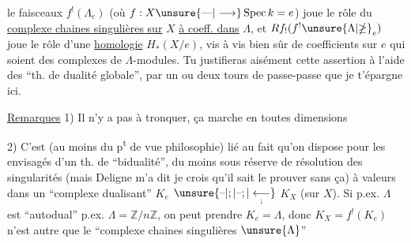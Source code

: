 %
le  faisceaux $f^!(\Lambda_e)$ (où $f:X\unsure{\text{---}|\longrightarrow}\operatorname{Spec} k=e$) joue le rôle du \uline{complexe  chaines singulières sur} $X$ \uline{à coeff. dans} $\Lambda$, et $Rf_!(f^!{\unsure{\Lambda|\mathbb{\Lambda}}}_e)$ joue le rôle d'une \uline{homologie} $H_*(X/e)$, vis à vis bien sûr de coefficients sur $e$ qui soient des complexes de $\Lambda$-modules. Tu justifieras aisément cette assertion à l'aide des ``th. de dualité globale'', par un ou deux tours de passe-passe que je t'épargne ici.

\uline{Remarques} 1) Il n'y a pas à tronquer, ça marche en toutes dimensions

2) C'est (au moins du p\textsuperscript{t} de vue philosophie) lié au fait qu'on dispose pour les  envisagés  d'un th. de ``bidualité''\unsure{\deleted{)}|\textsuperscript{(*)}}, du moins sous réserve de résolution des singularités (mais Deligne m'a dit je crois qu'il sait le prouver sans ça) à valeurs dans un ``complexe dualisant'' $K_e$  $\unsure{\text{--}|;|\text{--};|\underset{\text{;}}{\longleftarrow}}$ $K_X$ (sur $X$). Si p.ex. $\Lambda$ est ``autodual''  p.ex. $\Lambda=\mathbb{Z}/n\mathbb{Z}$, on peut prendre $K_e=\Lambda$, donc  $K_X=f^!(K_e)$ n'est autre que le ``complexe  chaines singulières    $\unsure{\Lambda}$'' 
